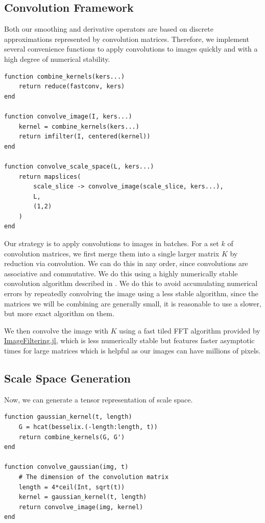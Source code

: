 \documentclass{article}
\begin{document}
\subsection{Convolution Framework}

Both our smoothing and derivative operators are based on discrete approximations represented by convolution matrices.
Therefore, we implement several convenience functions to apply convolutions to images quickly and with a high degree of numerical stability.
\begin{lstlisting}
function combine_kernels(kers...)
    return reduce(fastconv, kers)
end

function convolve_image(I, kers...)
    kernel = combine_kernels(kers...)
    return imfilter(I, centered(kernel))
end

function convolve_scale_space(L, kers...)
    return mapslices(
        scale_slice -> convolve_image(scale_slice, kers...),
        L,
        (1,2)
    )
end
\end{lstlisting}

Our strategy is to apply convolutions to images in batches.
For a set $k$ of convolution matrices, we first merge them into a single larger matrix $K$ by reduction via convolution.
We can do this in any order, since convolutions are associative and commutative.
We do this using a highly numerically stable convolution algorithm described in \cite{Amini}.
We do this to avoid accumulating numerical errors by repeatedly convolving the image using a less stable algorithm, since the matrices we will be combining are generally small, it is reasonable to use a slower, but more exact algorithm on them.

We then convolve the image with $K$ using a fast tiled FFT algorithm provided by \href{https://github.com/JuliaImages/ImageFiltering.jl}{ImageFiltering.jl}, which is less numerically stable but features faster asymptotic times for large matrices which is helpful as our images can have millions of pixels.

\subsection{Scale Space Generation}

Now, we can generate a tensor representation of scale space.
\begin{lstlisting}
function gaussian_kernel(t, length)
    G = hcat(besselix.(-length:length, t))
    return combine_kernels(G, G')
end

function convolve_gaussian(img, t)
    # The dimension of the convolution matrix
    length = 4*ceil(Int, sqrt(t))
    kernel = gaussian_kernel(t, length)
    return convolve_image(img, kernel)
end
\end{lstlisting}
\end{document}
